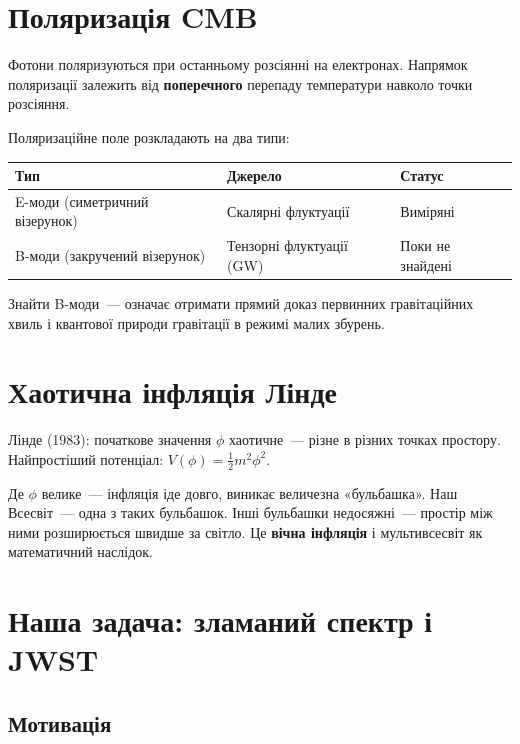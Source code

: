 \documentclass[12pt, a4paper]{article}
\begin{document}
\section{Поляризація CMB}

Фотони поляризуються при останньому розсіянні на електронах.
Напрямок поляризації залежить від \textbf{поперечного} перепаду температури
навколо точки розсіяння.

Поляризаційне поле розкладають на два типи:

\begin{center}
\begin{tabular}{lll}
\toprule
Тип & Джерело & Статус \\
\midrule
E-моди (симетричний візерунок) & Скалярні флуктуації & Виміряні \\
B-моди (закручений візерунок)  & Тензорні флуктуації (GW) & Поки не знайдені \\
\bottomrule
\end{tabular}
\end{center}

Знайти B-моди~--- означає отримати прямий доказ первинних гравітаційних хвиль
і квантової природи гравітації в режимі малих збурень.

\section{Хаотична інфляція Лінде}

Лінде (1983): початкове значення $\phi$ хаотичне~--- різне в різних точках простору.
Найпростіший потенціал: $V(\phi) = \frac{1}{2}m^2\phi^2$.

Де $\phi$ велике~--- інфляція іде довго, виникає величезна «бульбашка».
Наш Всесвіт~--- одна з таких бульбашок. Інші бульбашки недосяжні~---
простір між ними розширюється швидше за світло.
Це \textbf{вічна інфляція} і мультивсесвіт як математичний наслідок.

\section{Наша задача: зламаний спектр і JWST}

\subsection{Мотивація}
\end{document}
